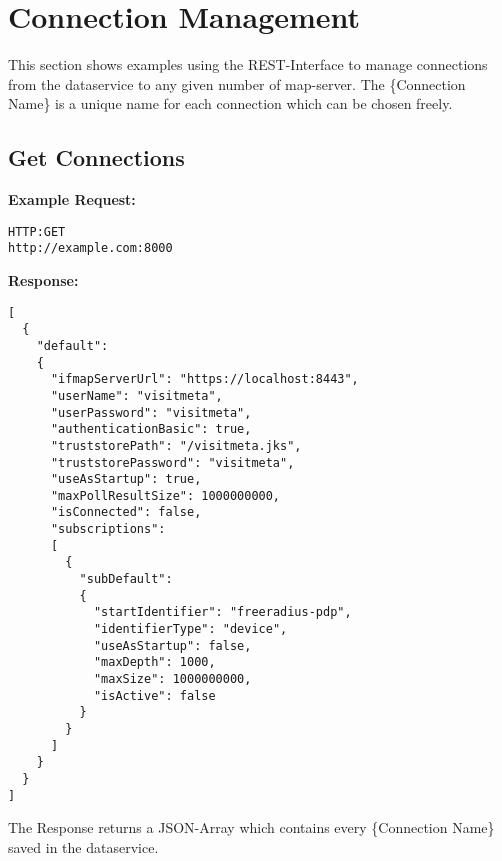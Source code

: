 \section{Connection Management}
This section shows examples using the REST-Interface to manage connections from the dataservice to any given number of map-server. The \{Connection Name\} is a unique name for each connection which can be chosen freely.

\subsection{Get Connections}
\textbf{Example Request:}
\begin{lstlisting}
HTTP:GET
http://example.com:8000
\end{lstlisting}

\textbf{Response:}
\begin{lstlisting}
[
  {
    "default":
    {
      "ifmapServerUrl": "https://localhost:8443",
      "userName": "visitmeta",
      "userPassword": "visitmeta",
      "authenticationBasic": true,
      "truststorePath": "/visitmeta.jks",
      "truststorePassword": "visitmeta",
      "useAsStartup": true,
      "maxPollResultSize": 1000000000,
      "isConnected": false,
      "subscriptions":
      [
        {
          "subDefault":
          {
            "startIdentifier": "freeradius-pdp",
            "identifierType": "device",
            "useAsStartup": false,
            "maxDepth": 1000,
            "maxSize": 1000000000,
            "isActive": false
          }
        }
      ]
    }
  }
]
\end{lstlisting}
The Response returns a JSON-Array which contains every \{Connection Name\} saved in the dataservice. 

